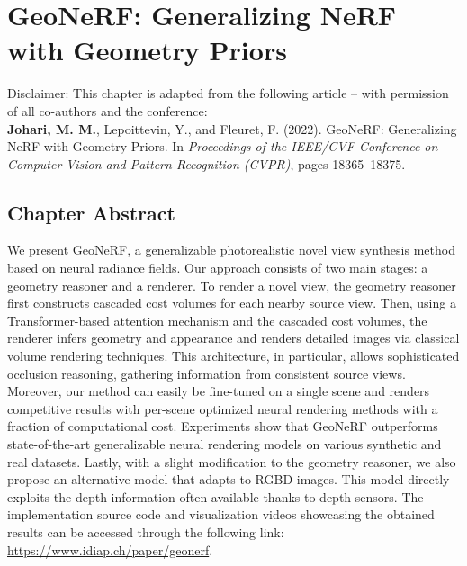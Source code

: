 \chapter{GeoNeRF: Generalizing NeRF with Geometry Priors} \label{sec:chapter3}

\begin{tcolorbox}[colback=gray!20, boxrule=1pt, colframe=black]
  Disclaimer: This chapter is adapted from the following article – with permission of all co-authors and the conference: \\

    \textbf{Johari, M. M.}, Lepoittevin, Y., and Fleuret, F. (2022). GeoNeRF: Generalizing NeRF with Geometry Priors. In \textit{Proceedings of the IEEE/CVF Conference on Computer Vision and Pattern Recognition (CVPR)}, pages 18365–18375.
\end{tcolorbox}

\section{Chapter Abstract}

We present GeoNeRF, a generalizable photorealistic novel view synthesis method based on neural radiance fields. Our approach consists of two main stages: a geometry reasoner and a renderer. To render a novel view, the geometry reasoner first constructs cascaded cost volumes for each nearby source view. Then, using a Transformer-based attention mechanism and the cascaded cost volumes, the renderer infers geometry and appearance and renders detailed images via classical volume rendering techniques. This architecture, in particular, allows sophisticated occlusion reasoning, gathering information from consistent source views. Moreover, our method can easily be fine-tuned on a single scene and renders competitive results with per-scene optimized neural rendering methods with a fraction of computational cost. Experiments show that GeoNeRF outperforms state-of-the-art generalizable neural rendering models on various synthetic and real datasets. Lastly, with a slight modification to the geometry reasoner, we also propose an alternative model that adapts to RGBD images. This model directly exploits the depth information often available thanks to depth sensors. The implementation source code and visualization videos showcasing the obtained results can be accessed through the following link: \href{https://www.idiap.ch/paper/geonerf}{https://www.idiap.ch/paper/geonerf}.

